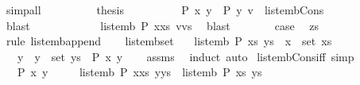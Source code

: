 \begin{isabellebody}
\ simp{\isacharunderscore}all\isanewline
\ \ \ \ \ \ \isamarkupfalse%
\ \isamarkupfalse%
\ {\isacharquery}thesis\isanewline
\ \ \ \ \ \ \ \ \isamarkupfalse%
\ {\isacartoucheopen}P\ x\ y{\isacartoucheclose}\ \ {\isacartoucheopen}P\ y\ v{\isacartoucheclose}\ \ list{\isacharunderscore}emb{\isacharunderscore}Cons{}\isanewline
\ \ \ \ \ \ \ \ \isamarkupfalse%
\ blast\isanewline
\ \ \ \ \isamarkupfalse%
\isanewline
\ \ \ \ \isamarkupfalse%
\ \isamarkupfalse%
\ {\isachardoublequoteopen}list{\isacharunderscore}emb\ P\ {\isacharparenleft}x{\isacharhash}xs{\isacharparenright}\ {\isacharparenleft}v{\isacharhash}vs{\isacharparenright}{\isachardoublequoteclose}\ \isamarkupfalse%
\ blast\isanewline
\ \ \ \ \isamarkupfalse%
\ \isamarkupfalse%
\ {\isacharquery}case\ \isamarkupfalse%
\ zs\ \isamarkupfalse%
\ {\isacharparenleft}rule\ list{\isacharunderscore}emb{\isacharunderscore}append{}{\isacharparenright}\isanewline
\ \ \isamarkupfalse%
\isanewline
{}\isamarkupfalse%
%
\endisatagproof
{\isafoldproof}%
%
\isadelimproof
\isanewline
%
\endisadelimproof
\isanewline
{}\isamarkupfalse%
\ list{\isacharunderscore}emb{\isacharunderscore}set{\isacharcolon}\isanewline
\ \ \ {\isachardoublequoteopen}list{\isacharunderscore}emb\ P\ xs\ ys{\isachardoublequoteclose}\ \ {\isachardoublequoteopen}x\ {\isasymin}\ set\ xs{\isachardoublequoteclose}\isanewline
\ \ \ y\ \ {\isachardoublequoteopen}y\ {\isasymin}\ set\ ys{\isachardoublequoteclose}\ \ {\isachardoublequoteopen}P\ x\ y{\isachardoublequoteclose}\isanewline
%
\isadelimproof
\ \ %
\endisadelimproof
%
\isatagproof
{}\isamarkupfalse%
\ assms\ \isamarkupfalse%
\ {\isacharparenleft}induct{\isacharparenright}\ auto%
\endisatagproof
{\isafoldproof}%
%
\isadelimproof
\isanewline
%
\endisadelimproof
\isanewline
{}\isamarkupfalse%
\ list{\isacharunderscore}emb{\isacharunderscore}Cons{\isacharunderscore}iff{}\ {\isacharbrackleft}simp{\isacharbrackright}{\isacharcolon}\isanewline
\ \ \ {\isachardoublequoteopen}P\ x\ y{\isachardoublequoteclose}\isanewline
\ \ \ \ \ {\isachardoublequoteopen}list{\isacharunderscore}emb\ P\ {\isacharparenleft}x{\isacharhash}xs{\isacharparenright}\ {\isacharparenleft}y{\isacharhash}ys{\isacharparenright}\ {\isasymlongleftrightarrow}\ list{\isacharunderscore}emb\ P\ xs\ ys{\isachardoublequoteclose}\isanewline

\end{isabellebody}
